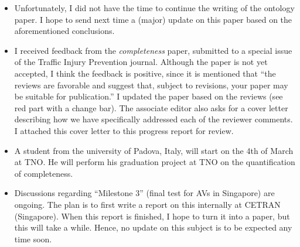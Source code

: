 \documentclass[10pt,final,a4paper,oneside,onecolumn]{article}
\begin{document}
\begin{itemize}
	\item Unfortunately, I did not have the time to continue the writing of the ontology paper. I hope to send next time a (major) update on this paper based on the aforementioned conclusions.
	\item I received feedback from the \emph{completeness} paper, submitted to a special issue of the Traffic Injury Prevention journal. Although the paper is not yet accepted, I think the feedback is positive, since it is mentioned that ``the reviews are favorable and suggest that, subject to revisions, your paper may be suitable for publication.'' I updated the paper based on the reviews (see red part with a change bar). The associate editor also asks for a cover letter describing how we have specifically addressed each of the reviewer comments. I attached this cover letter to this progress report for review.
	\item A student from the university of Padova, Italy, will start on the 4th of March at TNO. He will perform his graduation project at TNO on the quantification of completeness.
	\item Discussions regarding ``Milestone 3'' (final test for AVs in Singapore) are ongoing. The plan is to first write a report on this internally at CETRAN (Singapore). When this report is finished, I hope to turn it into a paper, but this will take a while. Hence, no update on this subject is to be expected any time soon.
\end{itemize}
\end{document}
